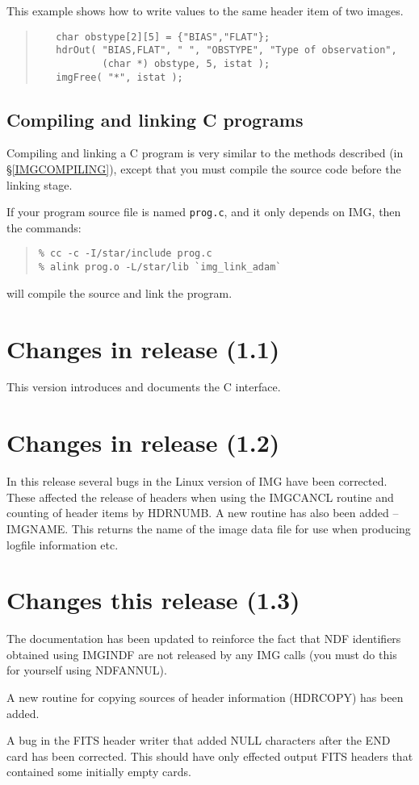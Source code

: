\documentclass[twoside,11pt]{article}
\newcommand{\hyperref}[4]{#2\ref{#4}#3}
\newcommand{\htmlref}[2]{#1}
\renewcommand{\_}{\texttt{\symbol{95}}}
\newcommand{\myverb}[1]{{\texttt{#1}}}
\newenvironment{code}{\begin{small} \begin{quote}}
                     {\end{quote} \end{small}}
\begin{document}
This example shows how to write values to the same header item of two images.
\begin{code}
\begin{verbatim}
   char obstype[2][5] = {"BIAS","FLAT"};
   hdrOut( "BIAS,FLAT", " ", "OBSTYPE", "Type of observation", 
           (char *) obstype, 5, istat );
   imgFree( "*", istat );
\end{verbatim}
\end{code}

\subsection{Compiling and linking C programs}
Compiling and linking a C program is very similar to the methods
described 
(\hyperref{in the Fortran section}{in \S}{}{IMGCOMPILING}), except
that you must compile the source code before the linking stage. 

If your program source file is named \myverb{prog.c}, and it only
depends on IMG, then the commands:
\begin{code}
\begin{verbatim}
% cc -c -I/star/include prog.c 
% alink prog.o -L/star/lib `img_link_adam`
\end{verbatim}
\end{code}
will compile the source and link the program.

\section{Changes in release (1.1)}

This version introduces and documents the C interface.

\section{Changes in release (1.2)}

In this release several bugs in the Linux version of IMG have been
corrected. These affected the release of headers when using the
\htmlref{IMG\_CANCL}{IMG\_CANCL} routine and counting of header items by 
\htmlref{HDR\_NUMB}{HDR\_NUMB}. A new routine has also been added --
\htmlref{IMG\_NAME}{IMG\_NAME}. This returns the name of the 
image data file for use when producing logfile information etc.

\section{Changes this release (1.3)}
The documentation has been updated to reinforce the fact that NDF
identifiers obtained using \htmlref{IMG\_INDF}{IMG\_INDF} are not
released by any IMG calls (you must do this for yourself using
NDF\_ANNUL). 

A new routine for copying sources of header information
(\htmlref{HDR\_COPY}{HDR\_COPY}) has been added. 

A bug in the FITS header writer that added NULL characters after the
END card has been corrected. This should have only effected output
FITS headers that contained some initially empty cards.
\end{document}
